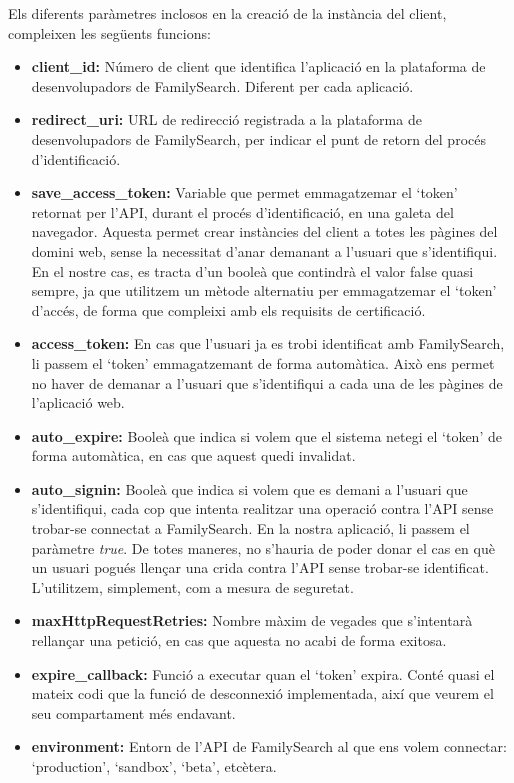 Els diferents paràmetres inclosos en la creació de la instància del client, compleixen les següents funcions:

\begin{itemize}
    \item \textbf{client\_id:} Número de client que identifica l'aplicació en la plataforma de desenvolupadors de FamilySearch. Diferent per cada aplicació.
    \item \textbf{redirect\_uri:} URL de redirecció registrada a la plataforma de desenvolupadors de FamilySearch, per indicar el punt de retorn del procés d'identificació.
    \item \textbf{save\_access\_token:} Variable que permet emmagatzemar el `token' retornat per l'API, durant el procés d'identificació, en una galeta del navegador. Aquesta permet crear instàncies del client a totes les pàgines del domini web, sense la necessitat d'anar demanant a l'usuari que s'identifiqui. En el nostre cas, es tracta d'un booleà que contindrà el valor false quasi sempre, ja que utilitzem un mètode alternatiu per emmagatzemar el `token' d'accés, de forma que compleixi amb els requisits de certificació.
    \item \textbf{access\_token:} En cas que l'usuari ja es trobi identificat amb FamilySearch, li passem el `token' emmagatzemant de forma automàtica. Això ens permet no haver de demanar a l'usuari que s'identifiqui a cada una de les pàgines de l'aplicació web.
    \item \textbf{auto\_expire:} Booleà que indica si volem que el sistema netegi el `token' de forma automàtica, en cas que aquest quedi invalidat.
    \item \textbf{auto\_signin:} Booleà que indica si volem que es demani a l'usuari que s'identifiqui, cada cop que intenta realitzar una operació contra l'API sense trobar-se connectat a FamilySearch. En la nostra aplicació, li passem el paràmetre \emph{true}. De totes maneres, no s'hauria de poder donar el cas en què un usuari pogués llençar una crida contra l'API sense trobar-se identificat. L'utilitzem, simplement, com a mesura de seguretat.
    \item \textbf{maxHttpRequestRetries:} Nombre màxim de vegades que s'intentarà re\-llan\-çar una petició, en cas que aquesta no acabi de forma exitosa.
    \item \textbf{expire\_callback:} Funció a executar quan el `token' expira. Conté quasi el mateix codi que la funció de desconnexió implementada, així que veurem el seu compartament més endavant.
    \item \textbf{environment:} Entorn de l'API de FamilySearch al que ens volem connectar: `production', `sandbox', `beta', etcètera.
\end{itemize}

